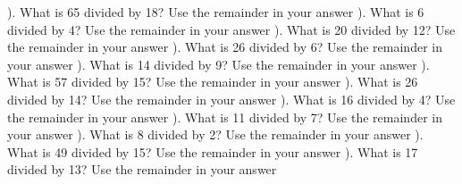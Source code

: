 \documentclass{article}%
\begin{document}
). What is 65 divided by 18? Use the remainder in your answer%
\newline%
\newline%
). What is 6 divided by 4? Use the remainder in your answer%
\newline%
\newline%
). What is 20 divided by 12? Use the remainder in your answer%
\newline%
\newline%
). What is 26 divided by 6? Use the remainder in your answer%
\newline%
\newline%
). What is 14 divided by 9? Use the remainder in your answer%
\newline%
\newline%
). What is 57 divided by 15? Use the remainder in your answer%
\newline%
\newline%
). What is 26 divided by 14? Use the remainder in your answer%
\newline%
\newline%
). What is 16 divided by 4? Use the remainder in your answer%
\newline%
\newline%
). What is 11 divided by 7? Use the remainder in your answer%
\newline%
\newline%
). What is 8 divided by 2? Use the remainder in your answer%
\newline%
\newline%
). What is 49 divided by 15? Use the remainder in your answer%
\newline%
\newline%
). What is 17 divided by 13? Use the remainder in your answer%
\newline%
\newline%
\newline%
\end{document}
